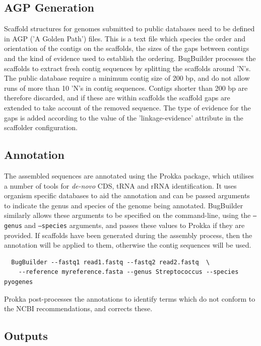 \documentclass[a4paper,10pt]{article}
\begin{document}
\subsection{AGP Generation}

Scaffold structures for genomes submitted to public databases need to be
defined in AGP ('A Golden Path') files. This is a text file which species the
order and orientation of the contigs on the scaffolds, the sizes of the gaps
between contigs and the kind of evidence used to establish the ordering.
BugBuilder processes the scaffolds to extract fresh contig sequences by
splitting the scaffolds around 'N's. The public database require a minimum
contig size of 200 bp, and do not allow runs of more than 10 'N's in contig
sequences. Contigs shorter than 200 bp are therefore discarded, and if these
are within scaffolds the scaffold gaps are extended to take account of the
removed sequence.  The type of evidence for the gaps is added according to the
value of the 'linkage-evidence' attribute in the  scaffolder configuration.

\subsection{Annotation}

The assembled sequences are annotated using the Prokka package, which utilises
a number of tools for \textit{de-novo} CDS, tRNA and rRNA  identification. It
uses organism specific databases to aid the annotation and can be passed
arguments to indicate the genus and species of the genome being annotated.
BugBuilder similarly allows these arguments to be specified on the
command-line, using the {\tt --genus} and {\tt --species} arguments, and passes
these values to Prokka if they are provided. If scaffolds have been generated
during the assembly process, then the annotation will be applied to them,
otherwise the contig sequences will be used.

\begin{verbatim}
  BugBuilder --fastq1 read1.fastq --fastq2 read2.fastq  \
    --reference myreference.fasta --genus Streptococcus --species pyogenes
\end{verbatim}

Prokka post-processes the annotations to identify terms which do not conform to
the NCBI recommendations, and corrects these. 

\subsection{Outputs}
\end{document}
